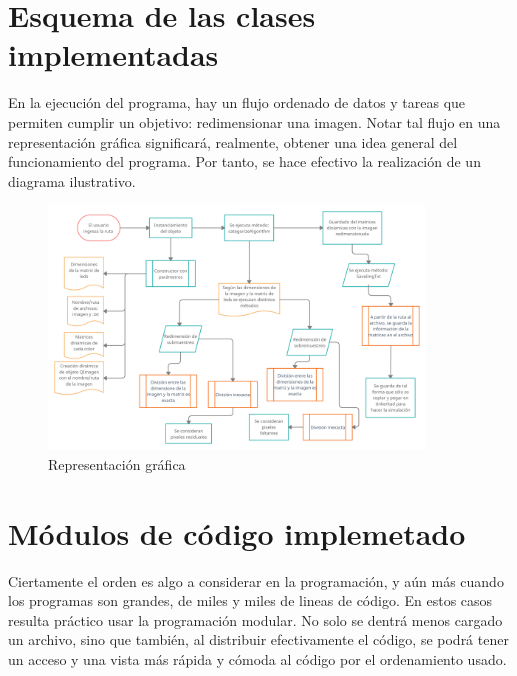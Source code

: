 \documentclass{article}
\begin{document}
\section{Esquema de las clases implementadas} \label{esquema}
En la ejecución del programa, hay un flujo ordenado de datos y tareas que permiten cumplir un objetivo: redimensionar una imagen. Notar tal flujo en una representación gráfica significará, realmente, obtener una idea general del funcionamiento del programa.
Por tanto, se hace efectivo la realización de un diagrama ilustrativo. 
\begin{figure}[h]
  \includegraphics[width=10cm]{Esquema_Parcial_II.png}
  \centering
  \caption{Representación gráfica}
  \label{fig:diagrama_ilustracion}
\end{figure}

\section{Módulos de código implemetado} \label{módulos de código}
Ciertamente el orden es algo a considerar en la programación, y aún más cuando los programas son grandes, de miles y miles de lineas de código. En estos casos resulta práctico usar la programación modular. No solo se dentrá menos cargado un archivo, sino que también, al distribuir efectivamente el código, se podrá tener un acceso y una vista más rápida y cómoda al código por el ordenamiento usado. 
\end{document}
